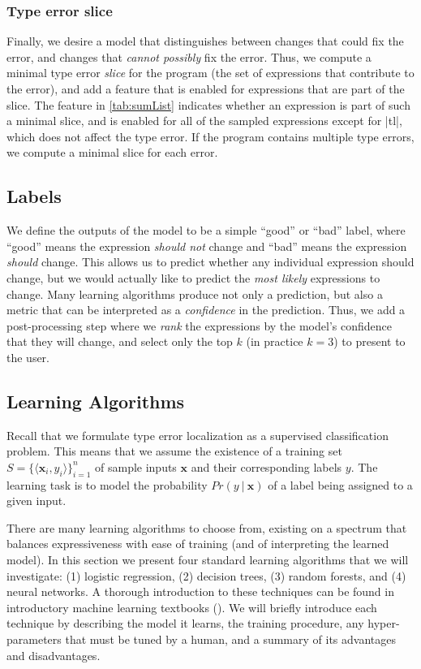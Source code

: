 \subsubsection{Type error slice}
Finally, we desire a model that distinguishes between
changes that could fix the error, and changes that
\emph{cannot possibly} fix the error.
%
Thus, we compute a minimal type error \emph{slice} for the program
(\ie the set of expressions that contribute to the error), and add a
feature that is enabled for expressions that are part of the slice.
%
The \InSlice feature in \autoref{tab:sumList} indicates whether an
expression is part of such a minimal slice, and is enabled for all of
the sampled expressions except for |tl|, which does not affect
the type error.
%
If the program contains multiple type errors, we compute
a minimal slice for each error.

\subsection{Labels}
\label{sec:labels}
We define the outputs of the model to be a simple ``good'' or ``bad''
label, where ``good'' means the expression \emph{should not} change and
``bad'' means the expression \emph{should} change. 
%
This allows us to predict whether any individual expression should
change, but we would actually like to predict the \emph{most likely}
expressions to change.
%
Many learning algorithms produce not only a prediction, but also a
metric that can be interpreted as a \emph{confidence} in the prediction.
%
Thus, we add a post-processing step where we \emph{rank} the expressions
by the model's confidence that they will change, and select only the top
$k$ (in practice $k=3$) to present to the user.

\subsection{Learning Algorithms}
\label{sec:models}
\lstDeleteShortInline{|} %

Recall that we formulate type error localization as a supervised
classification problem.
%
This means that we assume the existence of a training set
$S = \{\langle \mathbf{x}_i, y_i \rangle\}_{i=1}^{n}$
of sample inputs $\mathbf{x}$ and their corresponding labels $y$.
%
The learning task is to model the probability $Pr(y\ |\ \mathbf{x})$
of a label being assigned to a given input.

There are many learning algorithms to choose from, existing
on a spectrum that balances expressiveness with ease of training (and of
interpreting the learned model).
%
In this section we present four standard learning algorithms that we
will investigate:
%
(1) logistic regression,
(2) decision trees,
(3) random forests, and
(4) neural networks.
%
A thorough introduction to these techniques can be found in introductory
machine learning textbooks (\eg {}).
%
We will briefly introduce each technique by describing the model it
learns, the training procedure, any hyper-parameters that must be tuned
by a human, and a summary of its advantages and disadvantages.

